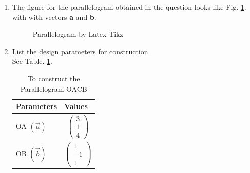 \renewcommand{\theequation}{\theenumi}
\begin{enumerate}[label=\thesection.\arabic*.,ref=\thesection.\theenumi]
\item The figure for the parallelogram obtained in the question looks like Fig. \ref{fig:parallelogram1}.
with with vectors \textbf{a} and \textbf{b}.


\begin{figure}[!ht]
\centering
\resizebox{\columnwidth}{!}{}
\caption{Parallelogram by Latex-Tikz}
\label{fig:parallelogram1}	
\end{figure}
%
%
%
\item List the design parameters for construction
\label{const:table1}
\\
\solution See Table. \ref{table:table1}. 
%
\begin{table}[ht!]
\centering
\begin{tabular}{ |p{3cm}|p{3cm}|  }
\hline
Parameters & Values \\
\hline
OA $(\vec{a}) $ & $$\begin{pmatrix}3\\1\\4\end{pmatrix} $$\\
\hline
OB $(\vec{b}) $ & $$\begin{pmatrix}1\\-1\\1\end{pmatrix} $$\\
\hline
\end{tabular}
%
\caption{To construct the Parallelogram OACB}
\label{table:table1}	
\end{table}


\end{enumerate}
